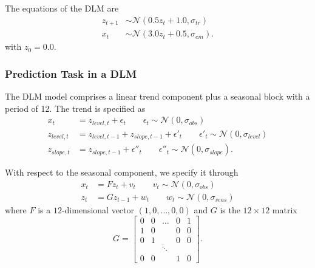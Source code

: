 The equations of the DLM are 
\begin{align*}
    z_{t+1} &\sim \mathcal{N}(0.5z_t + 1.0,\sigma_{tr}) \\
    x_{t} &\sim \mathcal{N}(3.0z_t + 0.5, \sigma_{em}).
\end{align*}
with $z_0  = 0.0$.


\subsubsection{Prediction Task in a DLM}
The DLM model comprises a linear trend component plus a seasonal block with a period of 12. The trend is specified as
\begin{align*}
x_t &= z_{level,t} + \epsilon_t \qquad \epsilon_t \sim \mathcal{N}(0, \sigma_{obs}) \\
z_{level,t} &= z_{level,t-1} + z_{slope,t-1} + \epsilon'_t \qquad \epsilon'_t \sim \mathcal{N}(0, \sigma_{level}) \\
z_{slope,t} &= z_{slope,t-1} + \epsilon''_t \qquad \epsilon''_t \sim \mathcal{N}(0, \sigma_{slope}).
\end{align*}

With respect to the seasonal component,
we specify it through
\begin{align*}
x_t &= F z_t + v_t \qquad v_t \sim \mathcal{N}(0, \sigma_{obs})\\
z_t &= G z_{t-1} + w_t \qquad w_t \sim \mathcal{N}(0, \sigma_{seas})
\end{align*}
where $F$ is a $12$-dimensional vector
$( 1,0,\ldots, 0,0)$ 
and $G$ is the $12\times 12$ matrix 
\begin{equation*}
G = \begin{bmatrix}
0 & 0 & \ldots & 0 & 1 \\
1 &	0 & & 0 & 0 \\
0 & 1 & & 0 & 0 \\
 & & \ddots & & \\
 0 & 0 & & 1 & 0
\end{bmatrix}.
\end{equation*}
\\

